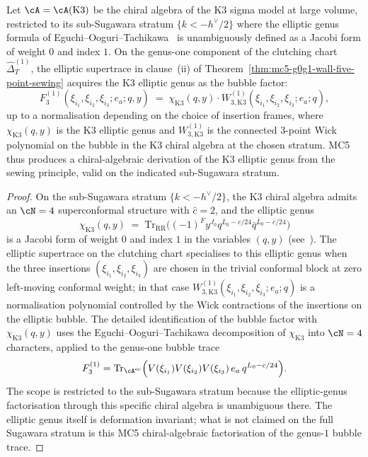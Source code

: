 \begin{corollary}
\label{cor:mc5-g0g1-k3-elliptic-genus}
Let $\cA = \cA(\mathrm{K3})$ be the chiral algebra of the K3 sigma model
at large volume, restricted to its sub-Sugawara stratum
$\{k < -h^{\vee}/2\}$ where the elliptic genus formula of
Eguchi--Ooguri--Tachikawa~\cite{EguchiOoguriTachikawa11} is unambiguously
defined as a Jacobi form of weight $0$ and index $1$. On the
genus-one component of the clutching chart
$\widehat{\Delta}^{(1)}_{T}$, the elliptic supertrace in
clause~\textup{(ii)} of
Theorem~\ref{thm:mc5-g0g1-wall-five-point-sewing} acquires the K3
elliptic genus as the bubble factor:
\begin{equation}
\label{eq:mc5-g0g1-k3-elliptic-genus-formula}
F^{(1)}_{3}(\xi_{i_{1}}, \xi_{i_{2}}, \xi_{i_{3}}; e_{a}; q, y)
\;=\;
\chi_{\mathrm{K3}}(q, y) \cdot W^{(1)}_{3, \mathrm{K3}}(\xi_{i_{1}}, \xi_{i_{2}}, \xi_{i_{3}}; e_{a}; q),
\end{equation}
up to a normalisation depending on the choice of insertion frames, where
$\chi_{\mathrm{K3}}(q, y)$ is the K3 elliptic genus and
$W^{(1)}_{3, \mathrm{K3}}$ is the connected $3$-point Wick polynomial on
the bubble in the K3 chiral algebra at the chosen stratum. MC5 thus
produces a chiral-algebraic derivation of the K3 elliptic genus from
the sewing principle, valid on the indicated sub-Sugawara stratum.
\end{corollary}

\begin{proof}
On the sub-Sugawara stratum $\{k < -h^{\vee}/2\}$, the K3 chiral algebra
admits an $\cN = 4$ superconformal structure with $\widehat{c} = 2$, and
the elliptic genus
\[
\chi_{\mathrm{K3}}(q, y)
\;=\;
\mathrm{Tr}_{\mathrm{RR}}\bigl((-1)^{F} y^{J_{0}} q^{L_{0} - c/24} \bar q^{\bar L_{0} - \bar c/24}\bigr)
\]
is a Jacobi form of weight $0$ and index $1$ in the variables $(q, y)$
\textup{(}see~\cite{EguchiOoguriTachikawa11}\textup{)}. The elliptic
supertrace on the clutching chart specialises to this elliptic genus
when the three insertions $(\xi_{i_{1}}, \xi_{i_{2}}, \xi_{i_{3}})$ are
chosen in the trivial conformal block at zero left-moving conformal
weight; in that case
$W^{(1)}_{3, \mathrm{K3}}(\xi_{i_{1}}, \xi_{i_{2}}, \xi_{i_{3}}; e_{a}; q)$
is a normalisation polynomial controlled by the Wick contractions of
the insertions on the elliptic bubble. The detailed identification of
the bubble factor with $\chi_{\mathrm{K3}}(q, y)$ uses the
Eguchi--Ooguri--Tachikawa decomposition of $\chi_{\mathrm{K3}}$ into
$\cN = 4$ characters, applied to the genus-one bubble trace
\[
F^{(1)}_{3}
=
\mathrm{Tr}_{\cA^{\evcore}}\Bigl(
V(\xi_{i_{1}})V(\xi_{i_{2}})V(\xi_{i_{3}})
\, e_{a}\, q^{L_{0}-c/24}\Bigr).
\]
The scope is
restricted to the sub-Sugawara stratum because the elliptic-genus
factorisation through this specific chiral algebra is unambiguous
there. The elliptic genus itself is deformation invariant; what is not
claimed on the full Sugawara stratum is this MC5 chiral-algebraic
factorisation of the genus-$1$ bubble trace.
\end{proof}

